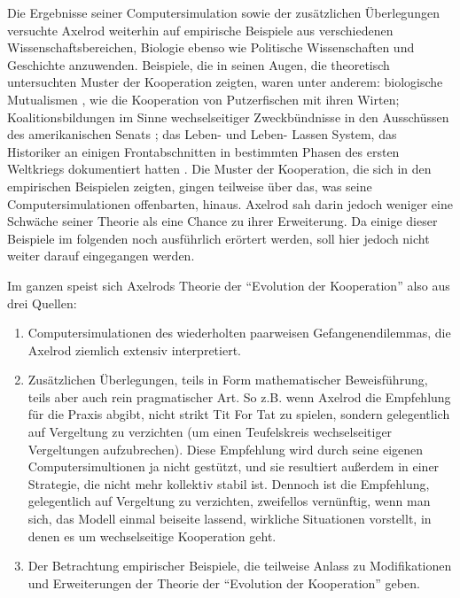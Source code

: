 \documentclass[12pt,a4paper,ngerman]{article}
\begin{document}
Die Ergebnisse seiner Computersimulation sowie der zusätzlichen
Überlegungen versuchte Axelrod weiterhin auf empirische Beispiele aus
verschiedenen Wissenschaftsbereichen, Biologie ebenso wie Politische
Wissenschaften und Geschichte anzuwenden. Beispiele, die in seinen
Augen, die theoretisch untersuchten Muster der Kooperation zeigten,
waren unter anderem: biologische Mutualismen \cite[S. 80ff.]{axelrod:1984}, 
wie die Kooperation von Putzerfischen mit ihren Wirten; Koalitionsbildungen im
Sinne wechselseitiger Zweckbündnisse in den Ausschüssen des amerikanischen
Senats \cite[S. 5]{axelrod:1984}; das Leben- und Leben- Lassen System, das
Historiker an einigen Frontabschnitten in bestimmten Phasen des ersten
Weltkriegs dokumentiert hatten \cite[S. 67ff.]{axelrod:1984}. Die Muster der
Kooperation, die sich in den empirischen Beispielen zeigten, gingen teilweise
über das, was seine Computersimulationen offenbarten, hinaus. Axelrod sah darin
jedoch weniger eine Schwäche seiner Theorie als eine Chance zu ihrer
Erweiterung. Da einige dieser Beispiele im folgenden noch ausführlich erörtert
werden, soll hier jedoch nicht weiter darauf eingegangen werden.

Im ganzen speist sich Axelrods Theorie der "`Evolution der Kooperation"' also
aus drei Quellen: 

\begin{enumerate}

\item Computersimulationen des wiederholten paarweisen Gefangenendilemmas, die
Axelrod ziemlich extensiv interpretiert.

\item Zusätzlichen Überlegungen, teils in Form mathematischer Beweisführung,
teils aber auch rein pragmatischer Art. So z.B. wenn Axelrod die
Empfehlung für die Praxis abgibt, nicht strikt Tit For Tat zu spielen,
sondern gelegentlich auf Vergeltung zu verzichten (um einen
Teufelskreis wechselseitiger Vergeltungen aufzubrechen). Diese
Empfehlung wird durch seine eigenen Computersimultionen ja nicht
gestützt, und sie resultiert außerdem in einer Strategie, die nicht
mehr kollektiv stabil ist. Dennoch ist die Empfehlung, gelegentlich
auf Vergeltung zu verzichten, zweifellos vernünftig, wenn man sich,
das Modell einmal beiseite lassend, wirkliche Situationen vorstellt,
in denen es um wechselseitige Kooperation geht.

\item Der Betrachtung empirischer Beispiele, die teilweise Anlass zu
Modifikationen und Erweiterungen der Theorie der "`Evolution der
Kooperation"' geben.
 
\end{enumerate}
\end{document}
